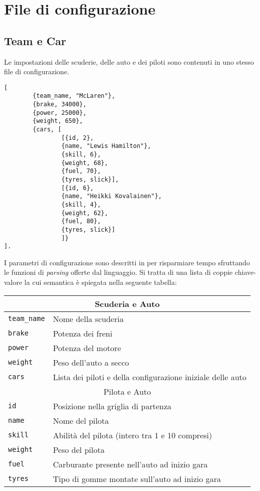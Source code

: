\chapter{File di configurazione}

\section*{Team e Car}
Le impostazioni delle scuderie, delle auto e dei piloti sono contenuti in uno stesso file di configurazione.

\begin{lstlisting}
[
        {team_name, "McLaren"},
        {brake, 34000},
        {power, 25000},
        {weight, 650},
        {cars, [
                [{id, 2},
                {name, "Lewis Hamilton"},
                {skill, 6},
                {weight, 68},
                {fuel, 70},
                {tyres, slick}],
                [{id, 6},
                {name, "Heikki Kovalainen"},
                {skill, 4},
                {weight, 62},
                {fuel, 80},
                {tyres, slick}]
                ]}
].
\end{lstlisting}

I parametri di configurazione sono descritti in \Erlang{} per risparmiare tempo sfruttando le funzioni di \textit{parsing} offerte dal linguaggio. Si tratta di una lista di coppie chiave-valore la cui semantica è spiegata nella seguente tabella:

\begin{center}
\begin{tabular}{|p{}|p{}|}
\hline
\multicolumn{2}{|c|}{Scuderia e Auto}\\
\hline
\texttt{team\_name} & Nome della scuderia\\
\texttt{brake} & Potenza dei freni\\
\texttt{power} & Potenza del motore\\
\texttt{weight} & Peso dell'auto a secco\\
\texttt{cars} & Lista dei piloti e della configurazione iniziale delle auto\\
\hline
\multicolumn{2}{|c|}{Pilota e Auto}\\
\hline
\texttt{id} & Posizione nella griglia di partenza\\
\texttt{name} & Nome del pilota\\
\texttt{skill} & Abilità del pilota (intero tra 1 e 10 compresi)\\
\texttt{weight} & Peso del pilota\\
\texttt{fuel} & Carburante presente nell'auto ad inizio gara\\
\texttt{tyres} & Tipo di gomme montate sull'auto ad inizio gara\\
\hline
\end{tabular}
\end{center}

